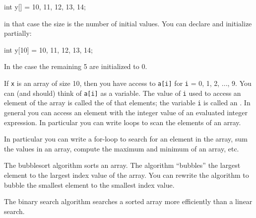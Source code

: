 \begin{consolethree}[escapeinside=||]
int y[] = {10, 11, 12, 13, 14};
\end{consolethree}

in that case the size is the number of initial values. You can declare and initialize partially:

\begin{consolethree}[escapeinside=||]
int y[10] = {10, 11, 12, 13, 14};
\end{consolethree}

In the case the remaining 5 are initialized to 0.

If \texttt{x} is an array of size 10, then you have access to \texttt{a[i]} for \texttt{i} = 0, 1, 2, ..., 9. You can (and should) think of \texttt{a[i]} as a variable. The value of \texttt{i} used to access an element of the array is called the  of that elements; the variable \texttt{i} is called an . In general you can access an element with the integer value of an evaluated integer expression. In particular you can write loops to scan the elements of an array.

In particular you can write a for-loop to search for an element in the array, sum the values in an array, compute the maximum and minimum of an array, etc.

The bubblesort algorithm sorts an array. The algorithm ``bubbles'' the largest element to the largest index value of the array. You can rewrite the algorithm to bubble the smallest element to the smallest index value.

The binary search algorithm searches a sorted array more efficiently than a linear search.
